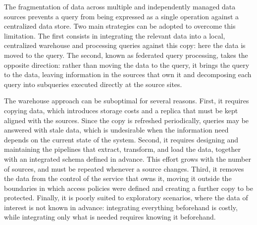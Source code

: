 The fragmentation of data across multiple and independently managed data sources
prevents a query from being expressed as a single operation against a
centralized data store. Two main strategies can be adopted to overcome this
limitation. The first consists in integrating the relevant data into a local,
centralized warehouse and processing queries against this copy: here the data is
moved to the query. The second, known as federated query processing, takes the
opposite direction: rather than moving the data to the query, it brings the
query to the data, leaving information in the sources that own it and decomposing
each query into subqueries executed directly at the source sites.

The warehouse approach can be suboptimal for several reasons. First, it
requires copying data, which introduces storage costs and a replica that must
be kept aligned with the sources. Since the copy is refreshed periodically,
queries may be answered with stale data, which is undesirable when the
information need depends on the current state of the system. Second, it
requires designing and maintaining the pipelines that extract, transform, and
load the data, together with an integrated schema defined in advance. This
effort grows with the number of sources, and must be repeated whenever a
source changes. Third, it removes the data from the control of the service
that owns it, moving it outside the boundaries in which access policies were
defined and creating a further copy to be protected. Finally, it is poorly
suited to exploratory scenarios, where the data of interest is not known in
advance: integrating everything beforehand is costly, while integrating only
what is needed requires knowing it beforehand.

